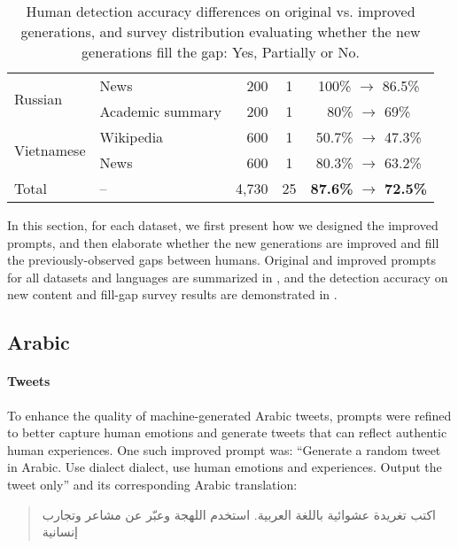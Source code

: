 \begin{table*}[t!]
\begin{tabular}{llr cll c}
    \midrule
    \multirow{2}{*}{Russian} 
    & News & 200 & 1 &  \multicolumn{3}{c}{100\% $\rightarrow$ 86.5\%} \\
    & Academic summary & 200 & 1 & \multicolumn{3}{c}{80\% $\rightarrow$ 69\%} \\
    \midrule
    \multirow{2}{*}{Vietnamese} 
    & Wikipedia & 600 & 1 & \multicolumn{3}{c}{ 50.7\% $\rightarrow$ 47.3\% } \\
    & News & 600 & 1 & \multicolumn{3}{c}{ 80.3\% $\rightarrow$ 63.2\% } \\
    \midrule
    Total & -- & 4,730 & 25 & \multicolumn{3}{c}{ \textbf{87.6\%} $\rightarrow$ \textbf{72.5\%} }  \\ %
    \bottomrule
    \end{tabular}
    \caption{Human detection accuracy differences on original vs. improved generations, and survey distribution evaluating whether the new generations fill the gap: Yes, Partially or No.}
    \label{tab:fill-gap-survey}
\end{table*}


In this section, for each dataset, we first present how we designed the improved prompts, and then elaborate whether the new generations are improved and fill the previously-observed gaps between humans.
Original and improved prompts for all datasets and languages are summarized in , and the detection accuracy on new content and fill-gap survey results are demonstrated in .


\subsection{Arabic}
\paragraph{Tweets}
To enhance the quality of machine-generated Arabic tweets, prompts were refined to better capture human emotions and generate tweets that can reflect authentic human experiences. One such improved prompt was: ``Generate a random tweet in Arabic. Use {dialect} dialect, use human emotions and experiences. Output the tweet only'' and its corresponding Arabic translation:
\begin{quote}
    \small
    \begin{RLtext}
    اكتب تغريدة عشوائية باللغة العربية. استخدم اللهجة وعبّر عن مشاعر وتجارب إنسانية
    \end{RLtext}
\end{quote}

